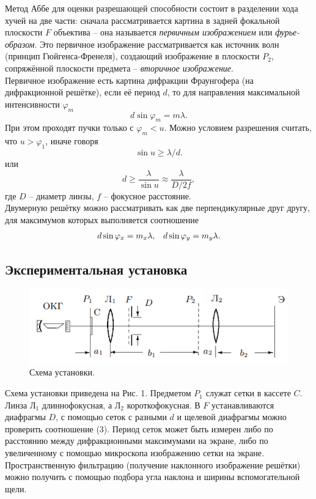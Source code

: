 \documentclass[a4paper,12pt]{article}
\begin{document}
Метод Аббе для оценки разрешающей способности состоит в разделении хода хучей на две части: сначала рассматривается картина в задней фокальной плоскости $F$ объектива -- она называется \textit{первичным изображением} или \textit{фурье-образом}. Это первичное изображение рассматривается как источник волн (принцип Гюйгенса-Френеля), создающий изображение в плоскости $P_2$, сопряжённой плоскости предмета -- \textit{вторичное изображение}.\\
Первичное изображение есть картина дифракции Фраунгофера (на дифракционной решётке), если её период $d$, то для направления максимальной интенсивности $\varphi_m$
\begin{equation}
d \sin \varphi_m = m\lambda.
\end{equation}
При этом проходят пучки только с $\varphi_m < u$. Можно условием разрешения считать, что $u > \varphi_1$, иначе говоря
$$
\sin u \geq \lambda/d.
$$
или
\begin{equation}
d \geq \dfrac{\lambda}{\sin u} \approx \dfrac{\lambda}{D/2f},
\end{equation}
где $D$ -- диаметр линзы, $f$ -- фокусное расстояние.\\
Двумерную решётку можно рассматривать как две перпендикулярные друг другу, для максимумов которых выполняется соотношение
\begin{equation}
\begin{array}{c c}
d\sin \varphi_x = m_x \lambda, & d\sin \varphi_y = m_y \lambda. \\
\end{array}
\end{equation}
\newpage
\subsection{Экспериментальная установка}
\begin{figure}[h]
\includegraphics[scale=0.7]{1.png}
\centering
\caption{Схема установки.}
\end{figure}
Схема установки приведена на Рис. 1. Предметом $P_1$ служат сетки в кассете $C$. Линза $\text{Л}_1$ длиннофокусная, а $\text{Л}_2$ короткофокусная. В $F$ устанавливаются диафрагмы $D$, с помощью сеток с разными $d$ и щелевой диафрагмы можно проверить соотношение (3). Период сеток может быть измерен либо по расстоянию между дифракционными максимумами на экране, либо по увеличенному с помощью микроскопа изображению сетки на экране. Пространственную фильтрацию (получение наклонного изображение решётки) можно получить с помощью подбора угла наклона и ширины вспомогательной щели.
\newpage
\end{document}
